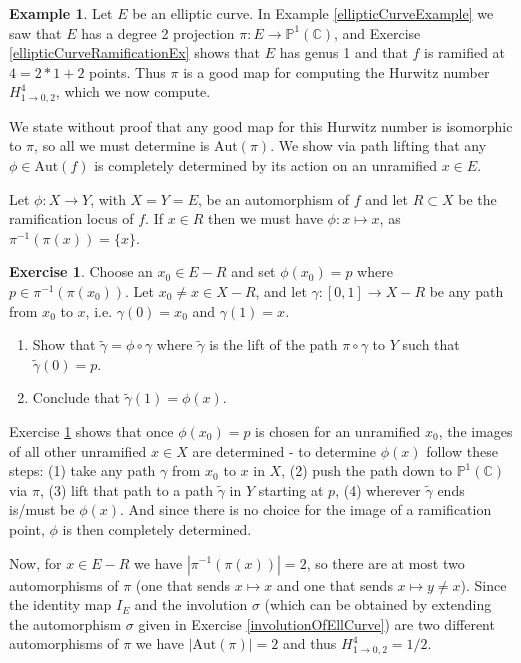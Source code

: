 \documentclass[12pt]{book}%
\theoremstyle{plain}
\theoremstyle{definition}
\newtheorem{example}[theorem]{Example}
\newtheorem{exercise}{Exercise}
\theoremstyle{remark}
\def\to{\rightarrow}
\newcommand{\PoneC}{{\mathbb P}^1({\mathbb C})}
\begin{document}
\noindent\hrulefill

\begin{example}
Let $E$ be an elliptic curve. In Example \ref{ellipticCurveExample} we saw that $E$ has a degree 2 projection $\pi:E \to \PoneC$, and Exercise \ref{ellipticCurveRamificationEx} shows that $E$ has genus 1 and that $f$ is ramified at $4=2*1+2$ points. Thus $\pi$ is a good map for computing the Hurwitz number $H^4_{1\to 0,2}$, which we now compute.

We state without proof that any good map for this Hurwitz number is isomorphic to $\pi$, so all we must determine is $\text{Aut}(\pi)$. We show via path lifting that any $\phi \in \text{Aut}(f)$ is completely determined by its action on an unramified $x \in E$.

Let $\phi:X \to Y$, with $X=Y=E$, be an automorphism of $f$ and let $R\subset X$ be the ramification locus of $f$. If $x \in R$ then we must have $\phi:x \mapsto x$, as $\pi^{-1}(\pi(x)) = \{x\}$.

\begin{exercise}
\label{constructingAutViaLifting}
Choose an $x_0  \in E - R$ and set $\phi(x_0)=p$ where $p \in \pi^{-1}(\pi(x_0))$. Let $x_0 \neq x \in X - R$, and let $\gamma:[0,1] \to X - R$ be any path from $x_0$ to $x$, i.e. $\gamma(0) = x_0$ and $\gamma(1)=x$. 
\begin{enumerate}
\item Show that $\tilde{\gamma} = \phi \circ \gamma$ where $\tilde{\gamma}$ is the lift of the path $\pi \circ \gamma$ to $Y$ such that $\tilde{\gamma}(0) = p$.

\item Conclude that $\tilde{\gamma}(1) = \phi(x)$.
\end{enumerate}
\end{exercise}

Exercise \ref{constructingAutViaLifting} shows that once $\phi(x_0)=p$ is chosen for an unramified $x_0$, the images of all other unramified $x\in X$ are determined - to determine $\phi(x)$ follow these steps: (1) take any path $\gamma$ from $x_0$ to $x$ in $X$, (2) push the path down to $\PoneC$ via $\pi$, (3) lift that path to a path $\tilde{\gamma}$ in $Y$ starting at $p$, (4) wherever $\tilde{\gamma}$ ends is/must be $\phi(x)$. And since there is no choice for the image of a ramification point, $\phi$ is then completely determined.

Now, for $x \in E - R$ we have $|\pi^{-1}(\pi(x))| = 2$, so there are at most two automorphisms of $\pi$ (one that sends $x \mapsto x$ and one that sends $x \mapsto y \neq x$). Since the identity map $I_E$ and the involution $\sigma$ (which can be obtained by extending the automorphism $\sigma$ given in Exercise \ref{involutionOfEllCurve}) are two different automorphisms of $\pi$ we have $|\text{Aut}(\pi)|=2$ and thus $H^4_{1\to 0,2} = 1/2$.
\end{example}
\end{document}
